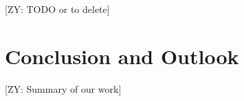 \documentclass[conference]{IEEEtran}
\newcommand{\ZY}[1]{{\color{purple}[ZY: #1]}}
\begin{document}
\ZY{TODO or to delete}





\section{Conclusion and Outlook}

    \ZY{Summary of our work}







\newpage






\end{document}
